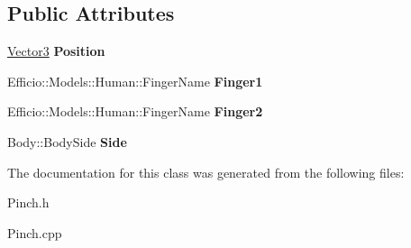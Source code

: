 \subsection*{Public Attributes}
\begin{DoxyCompactItemize}
\item 
\hyperlink{class_efficio_1_1_vector3}{Vector3} {\bfseries Position}\hypertarget{class_efficio_1_1_input_recognition_1_1_human_1_1_hands_1_1_pinch_aef25b5e89e91b9e9a7886a087c1b019f}{}\label{class_efficio_1_1_input_recognition_1_1_human_1_1_hands_1_1_pinch_aef25b5e89e91b9e9a7886a087c1b019f}

\item 
Efficio\+::\+Models\+::\+Human\+::\+Finger\+Name {\bfseries Finger1}\hypertarget{class_efficio_1_1_input_recognition_1_1_human_1_1_hands_1_1_pinch_aa2ad33ef0ffebcd8a09733cd6c30fead}{}\label{class_efficio_1_1_input_recognition_1_1_human_1_1_hands_1_1_pinch_aa2ad33ef0ffebcd8a09733cd6c30fead}

\item 
Efficio\+::\+Models\+::\+Human\+::\+Finger\+Name {\bfseries Finger2}\hypertarget{class_efficio_1_1_input_recognition_1_1_human_1_1_hands_1_1_pinch_a854702098d1f325b9d50a532ddc414ba}{}\label{class_efficio_1_1_input_recognition_1_1_human_1_1_hands_1_1_pinch_a854702098d1f325b9d50a532ddc414ba}

\item 
Body\+::\+Body\+Side {\bfseries Side}\hypertarget{class_efficio_1_1_input_recognition_1_1_human_1_1_hands_1_1_pinch_afacf4440ba63d00e52e205b0710798d1}{}\label{class_efficio_1_1_input_recognition_1_1_human_1_1_hands_1_1_pinch_afacf4440ba63d00e52e205b0710798d1}

\end{DoxyCompactItemize}


The documentation for this class was generated from the following files\+:\begin{DoxyCompactItemize}
\item 
Pinch.\+h\item 
Pinch.\+cpp\end{DoxyCompactItemize}
